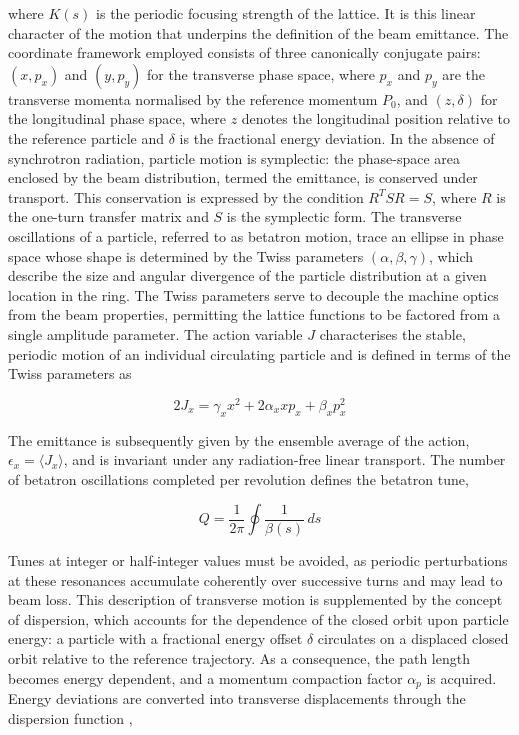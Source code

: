\documentclass[%
 aip,
 amsmath,amssymb,
 reprint,%
superscriptaddress
]{revtex4-2}
\begin{document}
where $K(s)$ is the periodic focusing strength of the lattice.\cite{wiedemann}
It is this linear character of the motion that underpins the definition of the beam emittance.
The coordinate framework employed consists of three canonically conjugate pairs: $(x, p_x)$ and $(y, p_y)$ for the transverse phase space, where $p_x$ and $p_y$ are the transverse momenta normalised by the reference momentum $P_0$, and $(z, \delta)$ for the longitudinal phase space, where $z$ denotes the longitudinal position relative to the reference particle and $\delta$ is the fractional energy deviation.
In the absence of synchrotron radiation, particle motion is symplectic: the phase-space area enclosed by the beam distribution, termed the emittance, is conserved under transport.
This conservation is expressed by the condition $R^T S R = S$, where $R$ is the one-turn transfer matrix and $S$ is the symplectic form.\cite{wiedemann}
The transverse oscillations of a particle, referred to as betatron motion, trace an ellipse in phase space whose shape is determined by the Twiss parameters $(\alpha, \beta, \gamma)$, which describe the size and angular divergence of the particle distribution at a given location in the ring.
The Twiss parameters serve to decouple the machine optics from the beam properties, permitting the lattice functions to be factored from a single amplitude parameter.
The action variable $J$ characterises the stable, periodic motion of an individual circulating particle and is defined in terms of the Twiss parameters as

\begin{equation}
  2J_x = \gamma_x x^2 + 2\alpha_x x p_x + \beta_x p_x^2
\end{equation}

The emittance is subsequently given by the ensemble average of the action, $\epsilon_x = \langle J_x \rangle$, and is invariant under any radiation-free linear transport.\cite{sylee,courantsnyder}
The number of betatron oscillations completed per revolution defines the betatron tune,

\begin{equation}
Q=\frac{1}{2\pi} \oint \frac{1}{\beta(s)} \, ds
\end{equation}

Tunes at integer or half-integer values must be avoided, as periodic perturbations at these resonances accumulate coherently over successive turns and may lead to beam loss.\cite{sylee}
This description of transverse motion is supplemented by the concept of dispersion, which accounts for the dependence of the closed orbit upon particle energy: a particle with a fractional energy offset $\delta$ circulates on a displaced closed orbit relative to the reference trajectory.
As a consequence, the path length becomes energy dependent, and a momentum compaction factor $\alpha_p$ is acquired.
Energy deviations are converted into transverse displacements through the dispersion function \cite{sylee,wiedemann},
\end{document}
